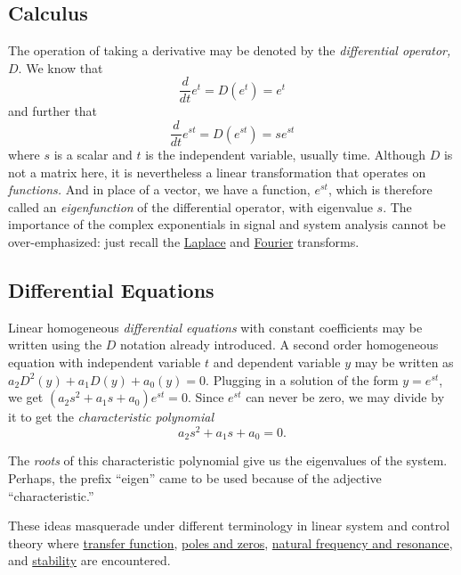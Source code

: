 \documentclass[
  11pt,
  a4paper,
]{article}
\begin{document}
\hypertarget{calculus}{%
\subsection{Calculus}\label{calculus}}

The operation of taking a derivative may be denoted by the
\emph{differential operator,} \(D\). We know that \[
\frac{d}{dt}e^{t} = D(e^{t}) = e^{t}
\] and further that \[
\frac{d}{dt}e^{st} = D(e^{st}) = se^{st}
\] where \(s\) is a scalar and \(t\) is the independent variable,
usually time. Although \(D\) is not a matrix here, it is nevertheless a
linear transformation that operates on \emph{functions.} And in place of
a vector, we have a function, \(e^{st}\), which is therefore called an
\emph{eigenfunction} of the differential operator, with eigenvalue
\(s\). The importance of the complex exponentials in signal and system
analysis cannot be over-emphasized: just recall the
\href{https://en.wikipedia.org/wiki/Laplace_transform}{Laplace} and
\href{https://en.wikipedia.org/wiki/Fourier_transform}{Fourier}
transforms.

\hypertarget{differential-equations}{%
\subsection{Differential Equations}\label{differential-equations}}

Linear homogeneous \emph{differential equations} with constant
coefficients may be written using the \(D\) notation already introduced.
A second order homogeneous equation with independent variable \(t\) and
dependent variable \(y\) may be written as
\(a_2D^2(y) + a_1D(y) + a_0(y) = 0\). Plugging in a solution of the form
\(y = e^{st}\), we get \((a_2s^2 + a_1s + a_0)e^{st} = 0.\) Since
\(e^{st}\) can never be zero, we may divide by it to get the
\emph{characteristic polynomial} \begin{equation}
a_2s^2 + a_1s + a_0 = 0.
\label{eq:cp}\end{equation}

The \emph{roots} of this characteristic polynomial give us the
eigenvalues of the system. Perhaps, the prefix ``eigen'' came to be used
because of the adjective ``characteristic.''

These ideas masquerade under different terminology in linear system and
control theory where
\href{https://en.wikipedia.org/wiki/Transfer_function}{transfer
function},
\href{http://web.mit.edu/2.14/www/Handouts/PoleZero.pdf}{poles and
zeros}, \href{https://www.youtube.com/watch?v=hcXbyS2Cf2o}{natural
frequency and resonance}, and
\href{https://en.wikibooks.org/wiki/Control_Systems/Stability}{stability}
are encountered.
\end{document}
